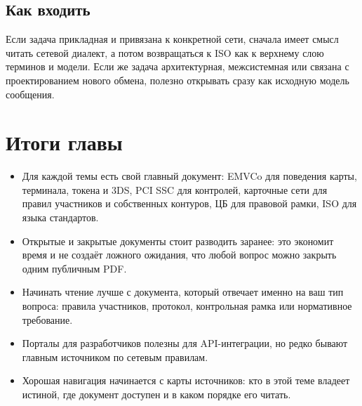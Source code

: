 \subsection*{Как входить}

Если задача прикладная и привязана к конкретной сети, сначала
имеет смысл читать сетевой диалект, а потом возвращаться к ISO
как к верхнему слою терминов и модели. Если же задача
архитектурная, межсистемная или связана с проектированием
нового обмена,  полезно открывать сразу
как исходную модель сообщения.

\section*{Итоги главы}
\begin{itemize}
  \item Для каждой темы есть свой главный документ: EMVCo для
        поведения карты, терминала, токена и 3DS, PCI SSC
        для контролей, карточные сети для правил участников
        и собственных контуров, ЦБ для правовой рамки, ISO
        для языка стандартов.
  \item Открытые и закрытые документы стоит разводить заранее:
        это экономит время и не создаёт ложного ожидания,
        что любой вопрос можно закрыть одним публичным PDF.
  \item Начинать чтение лучше с документа, который отвечает
        именно на ваш тип вопроса: правила участников, протокол,
        контрольная рамка или нормативное требование.
  \item Порталы для разработчиков полезны для API-интеграции,
        но редко бывают главным источником по сетевым правилам.
  \item Хорошая навигация начинается с карты источников:
        кто в этой теме владеет истиной, где документ доступен
        и в каком порядке его читать.
\end{itemize}

